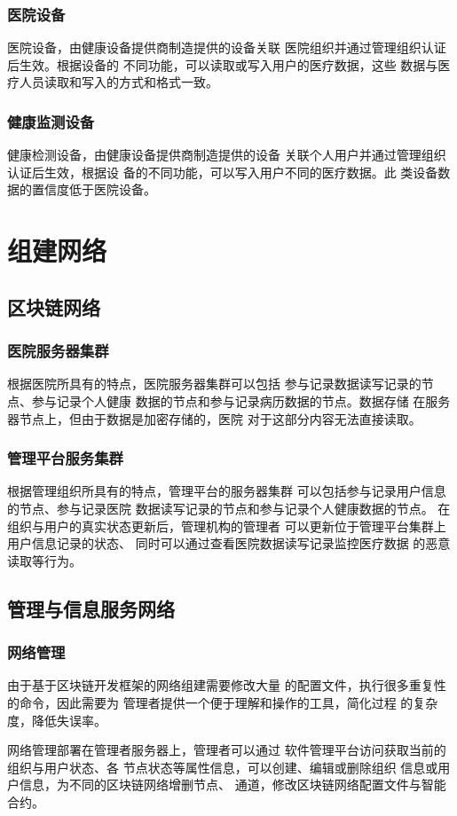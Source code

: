 \documentclass[UTF8]{ctexart}
\begin{document}
    \subsubsection{医院设备}
    \par
    医院设备，由健康设备提供商制造提供的设备关联
    医院组织并通过管理组织认证后生效。根据设备的
    不同功能，可以读取或写入用户的医疗数据，这些
    数据与医疗人员读取和写入的方式和格式一致。
    \subsubsection{健康监测设备}
    \par
    健康检测设备，由健康设备提供商制造提供的设备
    关联个人用户并通过管理组织认证后生效，根据设
    备的不同功能，可以写入用户不同的医疗数据。此
    类设备数据的置信度低于医院设备。

    \section{组建网络}
    \subsection{区块链网络}
    \subsubsection{医院服务器集群}
    \par
    根据医院所具有的特点，医院服务器集群可以包括
    参与记录数据读写记录的节点、参与记录个人健康
    数据的节点和参与记录病历数据的节点。数据存储
    在服务器节点上，但由于数据是加密存储的，医院
    对于这部分内容无法直接读取。
    \subsubsection{管理平台服务集群}
    \par
    根据管理组织所具有的特点，管理平台的服务器集群
    可以包括参与记录用户信息的节点、参与记录医院
    数据读写记录的节点和参与记录个人健康数据的节点。
    在组织与用户的真实状态更新后，管理机构的管理者
    可以更新位于管理平台集群上用户信息记录的状态、
    同时可以通过查看医院数据读写记录监控医疗数据
    的恶意读取等行为。
    \subsection{管理与信息服务网络}
    \subsubsection{网络管理}
    \par
    由于基于区块链开发框架的网络组建需要修改大量
    的配置文件，执行很多重复性的命令，因此需要为
    管理者提供一个便于理解和操作的工具，简化过程
    的复杂度，降低失误率。
    \par
    网络管理部署在管理者服务器上，管理者可以通过
    软件管理平台访问获取当前的组织与用户状态、各
    节点状态等属性信息，可以创建、编辑或删除组织
    信息或用户信息，为不同的区块链网络增删节点、
    通道，修改区块链网络配置文件与智能合约。
\end{document}
